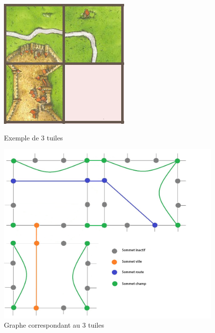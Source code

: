 \documentclass[a4paper, 11pt]{article}
\begin{document}
		    \begin{figure}[H]
		    \begin{minipage}[b]{0.45\textwidth}
		      \centering \includegraphics[width=\textwidth]{img/Trois_tuiles.jpg}
		      \caption{Exemple de 3 tuiles}
		   \end{minipage}\hfill
		    \begin{minipage}[b]{0.55\textwidth}
		      \centering \includegraphics[width=\textwidth]{img/Graphe_trois_tuiles.jpg}
		      \caption{Graphe correspondant au 3 tuiles}
              \label{fig:graphe-global}
		   \end{minipage}\hfill
		    \end{figure}
\end{document}
